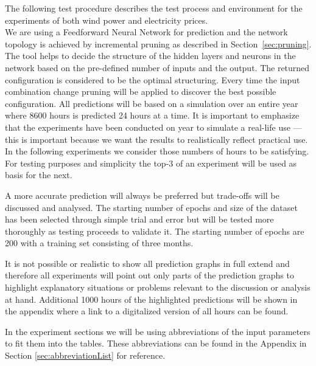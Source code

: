 The following test procedure describes the test process and environment for the experiments of both wind power and electricity prices. 
\\[0.5cm]
We are using a Feedforward Neural Network for prediction and the network topology is achieved by incremental pruning as described in Section~\ref{sec:pruning}. The tool helps to decide the structure of the hidden layers and neurons in the network based on the pre-defined number of inputs and the output. The returned configuration is considered to be the optimal structuring. Every time the input combination change pruning will be applied to discover the best possible configuration. All predictions will be based on a simulation over an entire year where 8600 hours is predicted 24 hours at a time. It is important to emphasize that the experiments have been conducted on year to simulate a real-life use --- this is important because we want the results to realistically reflect practical use. In the following experiments we consider those numbers of hours to be satisfying. For testing purposes and simplicity the top-3 of an experiment will be used as basis for the next. 

A more accurate prediction will always be preferred but trade-offs will be discussed and analysed. The starting number of epochs and size of the dataset has been selected through simple trial and error but will be tested more thoroughly as testing proceeds to validate it. The starting number of epochs are 200 with a training set consisting of three months. 

It is not possible or realistic to show all prediction graphs in full extend and therefore all experiments will point out only parts of the prediction graphs to highlight explanatory situations or problems relevant to the discussion or analysis at hand. Additional 1000 hours of the highlighted predictions will be shown in the appendix where a link to a digitalized version of all hours can be found. 

In the experiment sections we will be using abbreviations of the input parameters to fit them into the tables. These abbreviations can be found in the Appendix in Section \ref{sec:abbreviationList} for reference.

